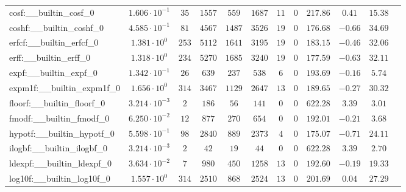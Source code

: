 \begin{tabular}{|l|c|c|c|c|c|c|c|c|c|c|c|}
cosf:\_\_builtin\_cosf\_0                 & $ 1.606 \cdot 10^{-1} $ & $ 35     $ & $ 1557  $ & $ 559   $ & $ 1687  $ & $ 11  $ & $ 0 $ & $ 217.86      $ & $ 0.41    $ & $ 15.38   $ \\
coshf:\_\_builtin\_coshf\_0               & $ 4.585 \cdot 10^{-1} $ & $ 81     $ & $ 4567  $ & $ 1487  $ & $ 3526  $ & $ 19  $ & $ 0 $ & $ 176.68      $ & $ -0.66   $ & $ 34.69   $ \\
erfcf:\_\_builtin\_erfcf\_0               & $ 1.381 \cdot 10^{0}  $ & $ 253    $ & $ 5112  $ & $ 1641  $ & $ 3195  $ & $ 19  $ & $ 0 $ & $ 183.15      $ & $ -0.46   $ & $ 32.06   $ \\
erff:\_\_builtin\_erff\_0                 & $ 1.318 \cdot 10^{0}  $ & $ 234    $ & $ 5270  $ & $ 1685  $ & $ 3240  $ & $ 19  $ & $ 0 $ & $ 177.59      $ & $ -0.63   $ & $ 32.11   $ \\
expf:\_\_builtin\_expf\_0                 & $ 1.342 \cdot 10^{-1} $ & $ 26     $ & $ 639   $ & $ 237   $ & $ 538   $ & $ 6   $ & $ 0 $ & $ 193.69      $ & $ -0.16   $ & $ 5.74    $ \\
expm1f:\_\_builtin\_expm1f\_0             & $ 1.656 \cdot 10^{0}  $ & $ 314    $ & $ 3467  $ & $ 1129  $ & $ 2647  $ & $ 13  $ & $ 0 $ & $ 189.65      $ & $ -0.27   $ & $ 30.32   $ \\
floorf:\_\_builtin\_floorf\_0             & $ 3.214 \cdot 10^{-3} $ & $ 2      $ & $ 186   $ & $ 56    $ & $ 141   $ & $ 0   $ & $ 0 $ & $ 622.28      $ & $ 3.39    $ & $ 3.01    $ \\
fmodf:\_\_builtin\_fmodf\_0               & $ 6.250 \cdot 10^{-2} $ & $ 12     $ & $ 877   $ & $ 270   $ & $ 654   $ & $ 0   $ & $ 0 $ & $ 192.01      $ & $ -0.21   $ & $ 3.68    $ \\
hypotf:\_\_builtin\_hypotf\_0             & $ 5.598 \cdot 10^{-1} $ & $ 98     $ & $ 2840  $ & $ 889   $ & $ 2373  $ & $ 4   $ & $ 0 $ & $ 175.07      $ & $ -0.71   $ & $ 24.11   $ \\
ilogbf:\_\_builtin\_ilogbf\_0             & $ 3.214 \cdot 10^{-3} $ & $ 2      $ & $ 42    $ & $ 19    $ & $ 44    $ & $ 0   $ & $ 0 $ & $ 622.28      $ & $ 3.39    $ & $ 2.70    $ \\
ldexpf:\_\_builtin\_ldexpf\_0             & $ 3.634 \cdot 10^{-2} $ & $ 7      $ & $ 980   $ & $ 450   $ & $ 1258  $ & $ 13  $ & $ 0 $ & $ 192.60      $ & $ -0.19   $ & $ 19.33   $ \\
log10f:\_\_builtin\_log10f\_0             & $ 1.557 \cdot 10^{0}  $ & $ 314    $ & $ 2510  $ & $ 868   $ & $ 2524  $ & $ 13  $ & $ 0 $ & $ 201.69      $ & $ 0.04    $ & $ 27.29   $ \\

\end{tabular}
